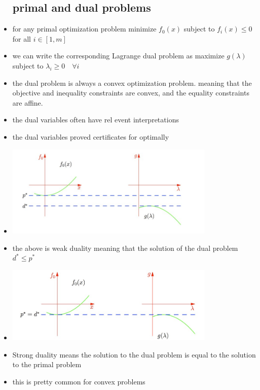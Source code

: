 \documentclass{article}
\begin{document}
\begin{itemize}
\subsection{primal and dual problems}
\item for any primal optimization problem minimize $f_{0}(x)$ subject to $f_{i}(x)\leq 0 $ for all $i\in[1,m]$
\item we can write the corresponding Lagrange dual problem as maximize $g(\lambda)$ subject to $\lambda_{i}\geq 0\quad \forall i$
\item the dual problem is always a convex optimization problem. meaning that the objective and inequality constraints are convex, and the equality constraints are affine. 
\item the dual variables often have rel event interpretations 
\item the dual variables proved certificates for optimally
\item \includegraphics[width=10cm]{lecture_notes/lecture_4/immmages/l4_14.jpg}
\item the above is weak duality meaning that the solution of the dual problem $d^{*}\leq p^{*}$
\item \includegraphics[width=10cm]{lecture_notes/lecture_4/immmages/l4_15.jpg}
\item Strong duality means the solution to the dual problem is equal to the solution to the primal problem 
\item this is pretty common for convex problems 

\end{itemize}
\end{document}
